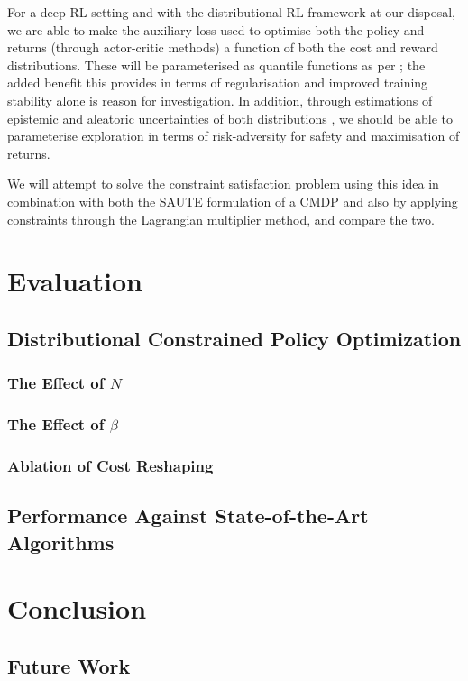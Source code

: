 \documentclass[12pt,twoside]{report}
\begin{document}
For a deep RL setting and with the distributional RL framework at our disposal, we are able to make the auxiliary loss used to optimise both the policy and returns (through actor-critic methods) a function of both the cost and reward distributions. These will be parameterised as quantile functions as per \cite{quantile-networks}; the added benefit this provides in terms of regularisation and improved training stability alone is reason for investigation. In addition, through estimations of epistemic and aleatoric uncertainties of both distributions \cite{risk-uncertainty}, we should be able to parameterise exploration in terms of risk-adversity for safety and maximisation of returns. 

We will attempt to solve the constraint satisfaction problem using this idea in combination with both the SAUTE \cite{saute} formulation of a CMDP and also by applying constraints through the Lagrangian multiplier method, and compare the two. 

\chapter{Evaluation}

\section{Distributional Constrained Policy Optimization}

\subsection{The Effect of $N$}

\subsection{The Effect of $\beta$}

\subsection{Ablation of Cost Reshaping}

\section{Performance Against State-of-the-Art Algorithms}

\chapter{Conclusion}

\section{Future Work}



\end{document}

